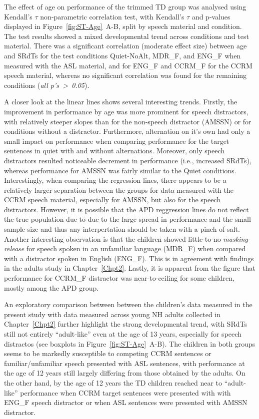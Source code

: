 \documentclass[a4paper, twoside]{templates/ociamthesis}
\begin{document}
The effect of age on performance of the trimmed TD group was analysed using Kendall's \(\tau\) non-parametric correlation test, with Kendall's \(\tau\) and p-values displayed in Figure~\ref{fig:ST-Age}~A-B, split by speech material and condition. The test results showed a mixed developmental trend across conditions and test material. There was a significant correlation (moderate effect size) between age and SRdTs for the test conditions Quiet-NoAlt, MDR\_F, and ENG\_F when measured with the ASL material, and for ENG\_F and CCRM\_F for the CCRM speech material, whereas no significant correlation was found for the remaining conditions (\emph{all p's~\textgreater~0.05}).

A closer look at the linear lines shows several interesting trends. Firstly, the improvement in performance by age was more prominent for speech distractors, with relatively steeper slopes than for the non-speech distractor (AMSSN) or for conditions without a distractor. Furthermore, alternation on it's own had only a small impact on performance when comparing performance for the target sentences in quiet with and without alternations. Moreover, only speech distractors resulted noticeable decrement in performance (i.e., increased SRdTs), whereas performance for AMSSN was fairly similar to the Quiet conditions. Interestingly, when comparing the regression lines, there appears to be a relatively larger separation between the groups for data measured with the CCRM speech material, especially for AMSSN, but also for the speech distractors. However, it is possible that the APD reggression lines do not reflect the true population due to due to the large spread in performance and the small sample size and thus any interpertation should be taken with a pinch of salt. Another interesting observation is that the children showed little-to-no \emph{masking-release} for speech spoken in an unfamiliar language (MDR\_F) when compared with a distractor spoken in English (ENG\_F). This is in agreement with findings in the adults study in Chapter~\ref{Chpt2}. Lastly, it is apparent from the figure that performance for CCRM\_F distractor was near-to-ceiling for some children, mostly among the APD group.

An exploratory comparison between between the children's data measured in the present study with data measured across young NH adults collected in Chapter~\ref{Chpt2} further highlight the strong developmental trend, with SRdTs still not entirely ``adult-like'' even at the age of 13 years, especially for speech distractos (see boxplots in Figure~\ref{fig:ST-Age}~A-B). The children in both groups seems to be markedly susceptible to competing CCRM sentences or familiar/unfamiliar speech presented with ASL sentences, with performance at the age of 12 years still largely differing from those obtained by the adults. On the other hand, by the age of 12 years the TD children reached near to ``adult-like'' performance when CCRM target sentences were presented with with ENG\_F speech distractor or when ASL sentences were presented with AMSSN distractor.
\end{document}
